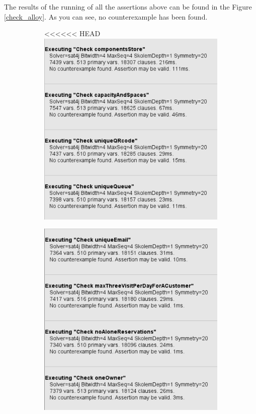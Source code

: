 \documentclass[a4paper, 12pt, oneside]{article}
\begin{document}
\begin{enumerate}[labelindent=20pt, label={UC.\arabic*}, itemindent=1em,leftmargin=!]
The results of the running of all the assertions above can be found in the Figure \ref{check_alloy}. As you can see, no counterexample has been found.
\newpage
\begin{figure}[h!]
\centering
\begin{subfigure}
<<<<<<< HEAD
    \centering
    \includegraphics[height=0.4\textheight, scale=0.2, keepaspectratio]{img/alloy/img_check_1.PNG}
 \end{subfigure}
 \begin{subfigure}
    \centering
    \includegraphics[height=0.4\textheight, scale=0.2, keepaspectratio]{img/alloy/img_check_2.PNG}

\end{subfigure}
\end{figure}
\end{enumerate}
\end{document}
